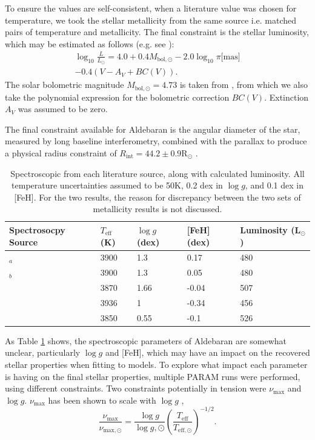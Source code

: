 \documentclass[modern]{aastex61}
\begin{document}
To ensure the values are self-consistent, when a literature value was chosen for temperature, we took the stellar metallicity from the same source i.e. matched pairs of temperature and metallicity. The final constraint is the stellar luminosity, which may be estimated as follows (e.g. see \citealt{pijpers2003}):
\begin{multline}
\log_{10} \frac{L}{L_{\odot}} = 4.0+
0.4 M_{{\textrm{bol}},\odot} -2.0 \log_{10} {\pi [{\textrm{mas}]}} \\-0.4(V-A_V + BC(V)).
\label{eqn:lum}
\end{multline}
The solar bolometric magnitude $M_{\textrm{bol},\odot}=4.73$ is taken from \cite{Torres2010}, from which we also take the polynomial expression for the bolometric correction $BC(V)$. Extinction $A_V$ was assumed to be zero.

The final constraint available for Aldebaran is the angular diameter of the star, measured by long baseline interferometry, combined with the parallax to produce a physical radius constraint of $R_{\textrm{int}}=44.2\pm0.9\textrm{R}_{\odot}$ \citep{richichi2005}.

\begin{table}
	\centering
	\caption{Spectroscopic from each literature source, along with calculated luminosity. All temperature uncertainties assumed to be 50K, 0.2 dex in $\log{g}$, and 0.1 dex in [FeH]. For the two  results, the reason for discrepancy between the two sets of metallicity results is not discussed.}
	\label{tab:spec}
	\begin{tabular}{lllll} %
		\hline
		Spectrosocpy Source & $T_{\textrm{eff}}$ (K) & $\log{g}$ (dex) & [FeH] (dex) & Luminosity (L$_{\odot}$)\\
		\hline
		\cite{2012Sheffield}$_{a}$	&	3900	&	1.3	&	0.17	&	480\\
		\cite{2012Sheffield}$_{b}$	&	3900	&	1.3	&	0.05	&	480\\
		\cite{2011Prugniel}	&	3870 & 1.66 & -0.04 & 507\\
		\cite{2008Massarotti} & 3936 & 1 & -0.34 & 456\\
		\cite{2009Frasca} & 3850 & 0.55 & -0.1 & 526\\
		\hline
	\end{tabular}
\end{table}

As Table \ref{tab:spec} shows, the spectroscopic parameters of Aldebaran are somewhat unclear, particularly $\log{g}$ and [FeH], which may have an impact on the recovered stellar properties when fitting to models. To explore what impact each parameter is having on the final stellar properties, multiple \textsc{PARAM} runs were performed, using different constraints. Two constraints potentially in tension were $\nu_{\textrm{max}}$ and $\log{g}$. $\nu_{\textrm{max}}$ has been shown to scale with $\log{g}$ \citep{Kjeldsen95, 2011A&A...530A.142B},
\begin{equation}
\frac{\nu_{\textrm{max}}}{\nu_{\textrm{max},\odot}}=\frac{\log{g}}{\log{g},\odot}\left(\frac{T_{\textrm{eff}}}{T_{\textrm{eff},\odot}}\right)^{-1/2}.
\label{eqn:numax}
\end{equation}
\end{document}
